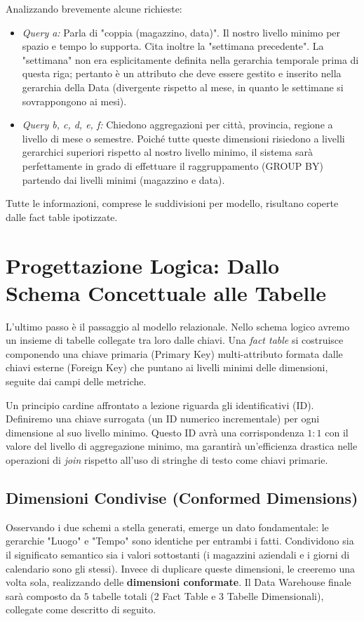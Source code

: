 Analizzando brevemente alcune richieste:
\begin{itemize}
    \item \textit{Query a:} Parla di "coppia (magazzino, data)". Il nostro livello minimo per spazio e tempo lo supporta. Cita inoltre la "settimana precedente". La "settimana" non era esplicitamente definita nella gerarchia temporale prima di questa riga; pertanto è un attributo che deve essere gestito e inserito nella gerarchia della Data (divergente rispetto al mese, in quanto le settimane si sovrappongono ai mesi).
    \item \textit{Query b, c, d, e, f:} Chiedono aggregazioni per città, provincia, regione a livello di mese o semestre. Poiché tutte queste dimensioni risiedono a livelli gerarchici superiori rispetto al nostro livello minimo, il sistema sarà perfettamente in grado di effettuare il raggruppamento (GROUP BY) partendo dai livelli minimi (magazzino e data).
\end{itemize}
Tutte le informazioni, comprese le suddivisioni per modello, risultano coperte dalle fact table ipotizzate.

\section{Progettazione Logica: Dallo Schema Concettuale alle Tabelle}

L'ultimo passo è il passaggio al modello relazionale. Nello schema logico avremo un insieme di tabelle collegate tra loro dalle chiavi.
Una \textit{fact table} si costruisce componendo una chiave primaria (Primary Key) multi-attributo formata dalle chiavi esterne (Foreign Key) che puntano ai livelli minimi delle dimensioni, seguite dai campi delle metriche.

Un principio cardine affrontato a lezione riguarda gli identificativi (ID). Definiremo una chiave surrogata (un ID numerico incrementale) per ogni dimensione al suo livello minimo. Questo ID avrà una corrispondenza $1:1$ con il valore del livello di aggregazione minimo, ma garantirà un'efficienza drastica nelle operazioni di \textit{join} rispetto all'uso di stringhe di testo come chiavi primarie.

\subsection{Dimensioni Condivise (Conformed Dimensions)}
Osservando i due schemi a stella generati, emerge un dato fondamentale: le gerarchie "Luogo" e "Tempo" sono identiche per entrambi i fatti. Condividono sia il significato semantico sia i valori sottostanti (i magazzini aziendali e i giorni di calendario sono gli stessi).
Invece di duplicare queste dimensioni, le creeremo una volta sola, realizzando delle \textbf{dimensioni conformate}. Il Data Warehouse finale sarà composto da $5$ tabelle totali (2 Fact Table e 3 Tabelle Dimensionali), collegate come descritto di seguito.

